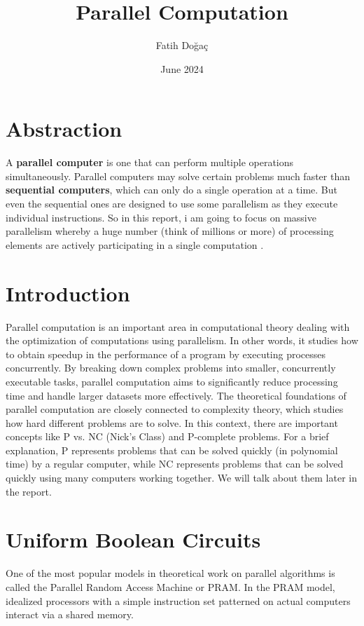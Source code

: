 \documentclass{article}
\title{Parallel Computation}
\author{Fatih Doğaç}
\date{June 2024}
\begin{document}
\maketitle


\section{Abstraction}
A \textbf{parallel computer} is one that can perform multiple operations simultaneously. Parallel computers may solve certain problems much faster than \textbf{sequential computers}, which can only do a single operation at a time.
\newline
But even the sequential ones are designed to use some parallelism as they execute individual instructions. So in this report, i am going to focus on massive parallelism whereby a huge number
(think of millions or more) of processing elements are actively participating in a
single computation .
\newpage

\section{Introduction}
Parallel computation is an important area in computational theory dealing with the optimization of computations using parallelism. In other words, it studies how to obtain speedup in the performance of a program by executing processes concurrently. By breaking down complex problems into smaller, concurrently executable tasks, parallel computation aims to significantly reduce processing time and handle larger datasets more effectively.
\newline
The theoretical foundations of parallel computation are closely connected to complexity theory, which studies how hard different problems are to solve. In this context, there are important concepts like P vs. NC (Nick's Class) and P-complete problems.
\newline
For a brief explanation, P represents problems that can be solved quickly (in polynomial time) by a regular computer, while NC represents problems that can be solved quickly using many computers working together. We will talk about them later in the report.

\newpage
\section{Uniform Boolean Circuits}
One of the most popular models in theoretical work on parallel algorithms is
called the Parallel Random Access Machine or PRAM. In the PRAM model,
idealized processors with a simple instruction set patterned on actual computers
interact via a shared memory. 
\end{document}
